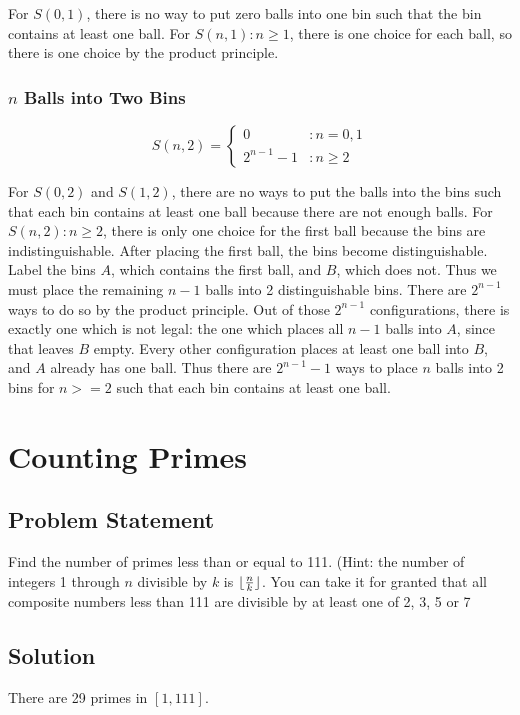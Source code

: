\documentclass[12pt]{article}
\DeclarePairedDelimiter\floor{\lfloor}{\rfloor}
\newcommand{\ProblemStatement}[1]{
\subsection*{Problem Statement}
#1
\subsection*{Solution}
}
\begin{document}
For $S(0, 1)$, there is no way to put zero balls into one bin such that the bin contains at least one ball. For $S(n, 1): n \ge 1$, there is one choice for each ball, so there is one choice by the product principle.

\subsubsection{$n$ Balls into Two Bins}
\[
    S(n, 2) = 
    \begin{cases}
        0&: n=0, 1\\
        2^{n-1}-1&: n \ge 2
    \end{cases}
\]

For $S(0, 2)$ and $S(1, 2)$, there are no ways to put the balls into the bins such that each bin contains at least one ball because there are not enough balls. For $S(n, 2): n \ge 2$, there is only one choice for the first ball because the bins are indistinguishable. After placing the first ball, the bins become distinguishable. Label the bins $A$, which contains the first ball, and $B$, which does not. Thus we must place the remaining $n-1$ balls into 2 distinguishable bins. There are $2^{n-1}$ ways to do so by the product principle. Out of those $2^{n-1}$ configurations, there is exactly one which is not legal: the one which places all $n-1$ balls into $A$, since that leaves $B$ empty. Every other configuration places at least one ball into $B$, and $A$ already has one ball. Thus there are $2^{n-1}-1$ ways to place $n$ balls into 2 bins for $n >= 2$ such that each bin contains at least one ball.

\section{Counting Primes}
\ProblemStatement{
Find the number of primes less than or equal to 111. (Hint: the number of integers 1 through $n$ divisible by $k$ is $\floor{\frac{n}{k}}$. You can take it for granted that all composite numbers less than 111 are divisible by at least one of 2, 3, 5 or 7
}

There are 29 primes in $[1, 111]$.
\end{document}
